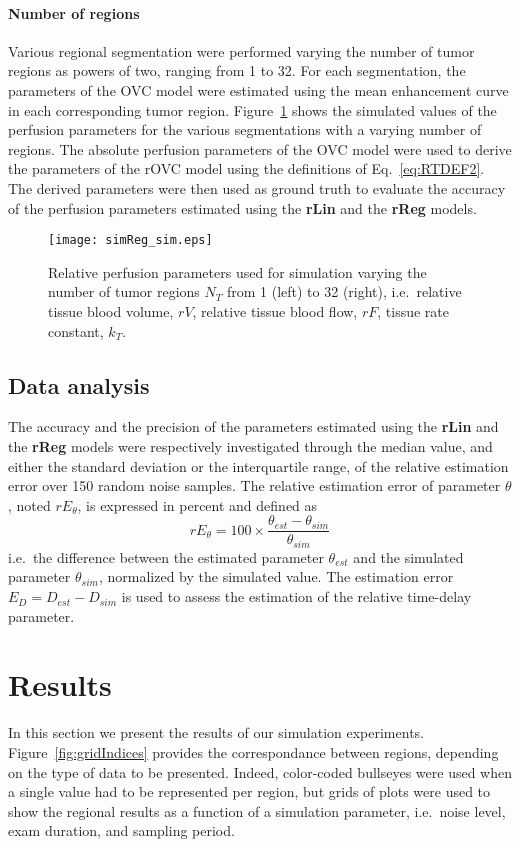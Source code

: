 \paragraph{Number of regions}
Various regional segmentation were performed varying the number of tumor regions as powers of two, ranging from 1 to 32.
For each segmentation, the parameters of the OVC model were estimated using the mean enhancement curve in each corresponding tumor region.
Figure~\ref{fig:simReg} shows the simulated values of the perfusion parameters for the various segmentations with a varying number of regions. 
The absolute perfusion parameters of the OVC model were used to derive the parameters of the rOVC model using the definitions of Eq.~\ref{eq:RTDEF2}.
The derived parameters were then used as ground truth to evaluate the accuracy of the perfusion parameters estimated using the \textbf{rLin} and the \textbf{rReg} models.

\begin{figure}
\texttt{[image: simReg\_sim.eps]}
\caption{Relative perfusion parameters used for simulation varying the number of tumor regions $N_T$ from 1 (left) to 32 (right), i.e.~relative tissue blood volume, $rV$, relative tissue blood flow, $rF$, tissue rate constant, $k_T$.}
\label{fig:simReg}
\end{figure}

\subsection{Data analysis}\label{sec:dataAnalysis}
The accuracy and the precision of the parameters estimated using the \textbf{rLin} and the \textbf{rReg} models were respectively investigated through the median value, and either the standard deviation or the interquartile range, of the relative estimation error over 150 random noise samples.
The relative estimation error of parameter $\theta$, noted $rE_{\theta}$, is expressed in percent and defined as
\begin{equation}
rE_{\theta} = 100 \times \frac{\theta_{est}-\theta_{sim}}{\theta_{sim}}
\end{equation}
i.e.~the difference between the estimated parameter $\theta_{est}$ and the simulated parameter $\theta_{sim}$, normalized by the simulated value.
The estimation error $E_{D} = D_{est}-D_{sim}$ is used to assess the estimation of the relative time-delay parameter.
\FloatBarrier

\section{Results}
In this section we present the results of our simulation experiments.
Figure~\ref{fig:gridIndices} provides the correspondance between regions, depending on the type of data to be presented.
Indeed, color-coded bullseyes were used when a single value had to be represented per region, but grids of plots were used to show the regional results as a function of a simulation parameter, i.e.~noise level, exam duration, and sampling period.

